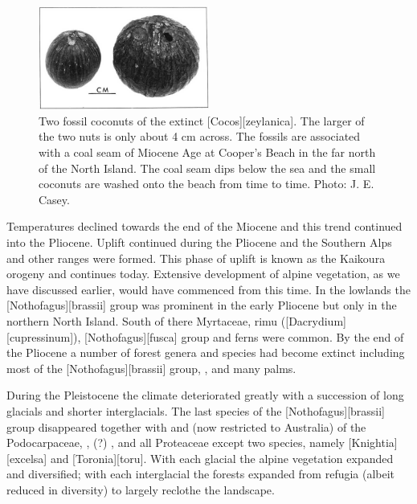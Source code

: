 \begin{figure}
	\includegraphics[width=0.5\textwidth]{graphics/figure124fossil-coconuts.jpg}
	\centering
	\caption[Two fossil coconuts]{Two fossil coconuts of the extinct [Cocos][zeylanica].
	The larger of the two nuts is only about 4 cm across.
	The fossils are associated with a coal seam of Miocene Age at Cooper's Beach in the far north of the North Island.
	The coal seam dips below the sea and the small coconuts are washed onto the beach from time to time.
	Photo: J. E. Casey.}%
	\label{fig:124fossil-coconuts}
\end{figure}

Temperatures declined towards the end of the Miocene and this trend continued into the Pliocene.
Uplift continued during the Pliocene and the Southern Alps and other ranges were formed.
This phase of uplift is known as the Kaikoura orogeny and continues today.
Extensive development of alpine vegetation, as we have discussed earlier, would have commenced from this time.
In the lowlands the [Nothofagus][brassii] group was prominent in the early Pliocene but only in the northern North Island.
South of there Myrtaceae, rimu ([Dacrydium][cupressinum]),  [Nothofagus][fusca] group and ferns were common.
By the end of the Pliocene a number of forest genera and species had become extinct including most of the [Nothofagus][brassii] group, ,  and many palms.

During the Pleistocene the climate deteriorated greatly with a succession of long glacials and shorter interglacials.
The last species of the [Nothofagus][brassii] group disappeared together with  and  (now restricted to Australia) of the Podocarpaceae, , (?) ,  and all Proteaceae except two species, namely [Knightia][excelsa] and [Toronia][toru].
With each glacial the alpine vegetation expanded and diversified; with each interglacial the forests expanded from refugia (albeit reduced in diversity) to largely reclothe the landscape.

